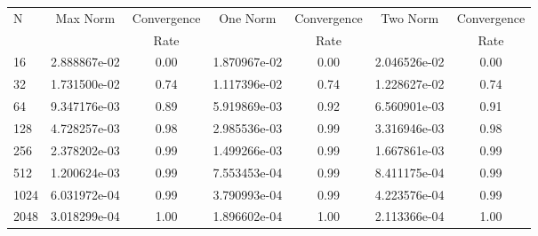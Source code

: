 \documentclass[12pt]{article}
\begin{document}
	\begin{tabular}{l|c|c|c|c|c|c}
		N&Max Norm&Convergence&One Norm&Convergence&Two Norm&Convergence\\
		&&Rate&&Rate&&Rate\\
		\hline
		16&2.888867e-02&0.00&1.870967e-02&0.00&2.046526e-02&0.00\\
		\hline
		32&1.731500e-02&0.74&1.117396e-02&0.74&1.228627e-02&0.74\\
		\hline
		64&9.347176e-03&0.89&5.919869e-03&0.92&6.560901e-03&0.91\\
		\hline
		128&4.728257e-03&0.98&2.985536e-03&0.99&3.316946e-03&0.98\\
		\hline
		256&2.378202e-03&0.99&1.499266e-03&0.99&1.667861e-03&0.99\\
		\hline
		512&1.200624e-03&0.99&7.553453e-04&0.99&8.411175e-04&0.99\\
		\hline
		1024&6.031972e-04&0.99&3.790993e-04&0.99&4.223576e-04&0.99\\
		\hline
		2048&3.018299e-04&1.00&1.896602e-04&1.00&2.113366e-04&1.00\\
	\end{tabular}
\end{document}
